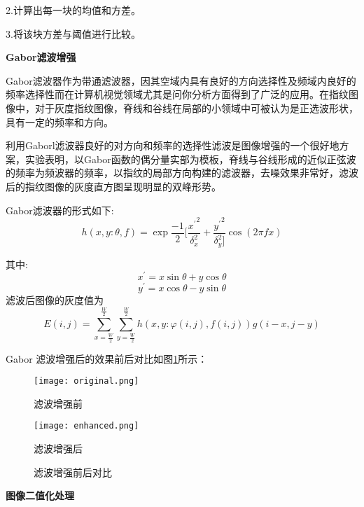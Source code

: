 \documentclass[withoutpreface,bwprint]{cumcmthesis} %
\begin{document}
2.计算出每一块的均值和方差。

3.将该块方差与阈值进行比较。

\textbf{Gabor滤波增强}

Gabor滤波器作为带通滤波器，因其空域内具有良好的方向选择性及频域内良好的频率选择性而在计算机视觉领域尤其是问你分析方面得到了广泛的应用\cite{贺颖2010应用}。在指纹图像中，对于灰度指纹图像，脊线和谷线在局部的小领域中可被认为是正选波形状，具有一定的频率和方向。\par
利用Gaborl滤波器良好的对方向和频率的选择性滤波是图像增强的一个很好地方案，实验表明，以Gabor函数的偶分量实部为模板，脊线与谷线形成的近似正弦波的频率为频波器的频率，以指纹的局部方向构建的滤波器，去噪效果非常好，滤波后的指纹图像的灰度直方图呈现明显的双峰形势。\par
Gabor滤波器的形式如下:
\begin{equation}
h(x, y: \theta, f)=\exp {\frac{-1}{2}[\frac{{x^\prime}^{2}}{\delta_{x}^{2}}+\frac{{y^\prime}^{2}}{\delta_{y}^{2}]} \cos (2\pi fx)}
\end{equation}

其中:$$x^\prime=x\sin{\theta}+y\cos{\theta}$$
$$y^\prime=x\cos{\theta}-y\sin{\theta}$$
滤波后图像的灰度值为
\begin{equation}
E(i,j)=\sum_{x=\frac{W}{2}}^{\frac{W}{2}}\sum_{y=\frac{W}{2}}^{\frac{W}{2}}h(x,y:\varphi(i,j),f(i,j))g(i-x,j-y)
\end{equation}

Gabor 滤波增强后的效果前后对比如图\ref{fig:enhance}所示：

\begin{figure}[H]
	\begin{minipage}[t]{0.45\textwidth}
		\centering
		\texttt{[image: original.png]}	
		\label{fig:original}
           \caption{滤波增强前}
	\end{minipage}
	\qquad
	\begin{minipage}[t]{0.45\textwidth}
		\centering
		\texttt{[image: enhanced.png]}
		\label{fig:enhanced}
          \caption{滤波增强后}	
	\end{minipage}
	\label{fig:enhance}
	\caption{滤波增强前后对比}	
\end{figure}


\textbf{图像二值化处理}
\end{document}
